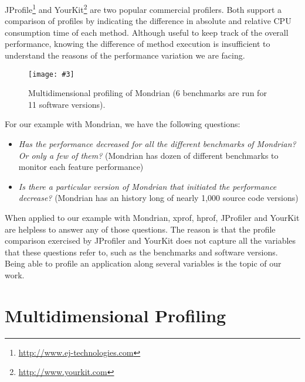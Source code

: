 \documentclass[10pt, conference, compsocconf]{IEEEtran}
\newcommand{\largefig}[4]{
	\begin{figure*}[#1]
		\centering
		\texttt{[image: \#3]}
		\caption{\label{fig:#3}#4}
	\end{figure*}}
\begin{document}
JProfile\footnote{\url{http://www.ej-technologies.com}} and YourKit\footnote{\url{http://www.yourkit.com}} are two popular commercial profilers. Both support a comparison of profiles by indicating the difference in absolute and relative CPU consumption time of each method. Although useful to keep track of the overall performance, knowing the difference of method execution is insufficient to understand the reasons of the performance variation we are facing. 

\largefig{}{1.0}{final3}{Multidimensional profiling of Mondrian (6 benchmarks are run for 11 software versions).}

For our example with Mondrian, we have the following questions:
\begin{itemize}
\item \emph{Has the performance decreased for all the different benchmarks of Mondrian? Or only a few of them?} (Mondrian has dozen of different benchmarks to monitor each feature performance)

\item \emph{Is there a particular version of Mondrian that initiated the performance decrease?} (Mondrian has an history long of nearly 1,000 source code versions)


\end{itemize}

When applied to our example with Mondrian, xprof, hprof, JProfiler and YourKit are helpless to answer any of those questions. The reason is that the profile comparison exercised by JProfiler and YourKit does not capture all the variables that these questions refer to, such as the benchmarks and software versions. Being able to profile an application along several variables is the topic of our work.

\section{Multidimensional Profiling}
\end{document}
